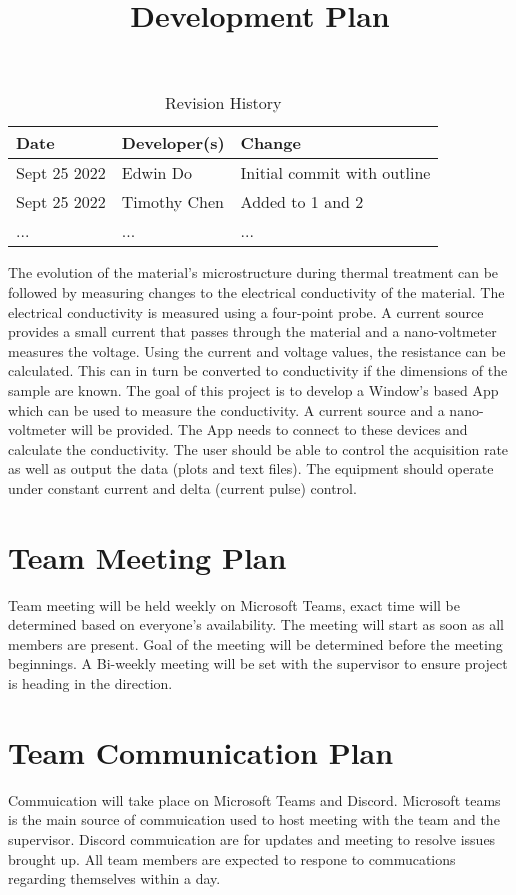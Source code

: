 \documentclass{article}
\title{Development Plan\\\progname}
\author{\authname}
\date{}
\begin{document}
\begin{table}[hp]
\caption{Revision History} \label{TblRevisionHistory}
\begin{tabularx}{\textwidth}{llX}
\toprule
\textbf{Date} & \textbf{Developer(s)} & \textbf{Change}\\
\midrule
Sept 25 2022 & Edwin Do & Initial commit with outline\\
Sept 25 2022 & Timothy Chen & Added to 1 and 2\\
... & ... & ...\\
\bottomrule
\end{tabularx}
\end{table}

\newpage

\maketitle

\indent The evolution of the material’s microstructure during thermal treatment can be followed by measuring changes to the electrical conductivity of the material. The electrical conductivity is measured using a four-point probe. A current source provides a small current that passes through the material and a nano-voltmeter measures the voltage. Using the current and voltage values, the resistance can be calculated. This can in turn be converted to conductivity if the dimensions of the sample are known. The goal of this project is to develop a Window’s based App which can be used to measure the conductivity. A current source and a nano- voltmeter will be provided. The App needs to connect to these devices and calculate the conductivity. The user should be able to control the acquisition rate as well as output the data (plots and text files). The equipment should operate under constant current and delta (current pulse) control.

\section{Team Meeting Plan}
Team meeting will be held weekly on Microsoft Teams, exact time will be determined based on everyone's availability.
The meeting will start as soon as all members are present. 
Goal of the meeting will be determined before the meeting beginnings. 
A Bi-weekly meeting will be set with the supervisor to ensure project is heading in the direction. 

\section{Team Communication Plan}
Commuication will take place on Microsoft Teams and Discord. 
Microsoft teams is the main source of commuication used to host meeting with the team and the supervisor. 
Discord commuication are for updates and meeting to resolve issues brought up. 
All team members are expected to respone to commucations regarding themselves within a day.
\end{document}
